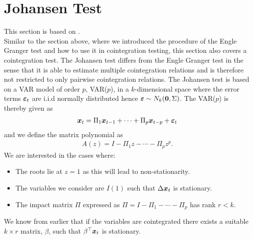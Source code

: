 \section{Johansen Test}\label{sect:johansen test}
This section is based on \cite{Johansen_test}.\\
Similar to the section above, where we introduced the procedure of the Engle Granger test and how to use it in cointegration testing, this section also covers a cointegration test. The Johansen test differs from the Engle Granger test in the sense that it is able to estimate multiple cointegration relations and is therefore not restricted to only pairwise cointegration relations. The Johansen test is based on a VAR model of order $p$, VAR($p$), in a $k$-dimensional space where the error terms $\boldsymbol{\varepsilon}_t$ are i.i.d normally distributed hence $\boldsymbol{\varepsilon}\sim N_k(\boldsymbol{0},\Sigma)$. The VAR($p$) is thereby given as
\begin{align}\label{eq:var_p_johansen}
\boldsymbol{x}_t=\Pi_1\boldsymbol{x}_{t-1}+\cdots+\Pi_p\boldsymbol{x}_{t-p}+\boldsymbol{\varepsilon}_t
\end{align}
and we define the matrix polynomial as
\begin{align*}
    A(z)=I-\Pi_1z-\cdots-\Pi_pz^p.
\end{align*}
We are interested in the cases where: 
\begin{itemize}
    \item The roots lie at $z=1$ as this will lead to non-stationarity.
    \item The variables we consider are $I(1)$ such that $\Delta \boldsymbol{x}_t$ is stationary.
    \item The impact matrix $\Pi$ expressed as $\Pi=I-\Pi_1-\cdots-\Pi_p$ has rank $r<k$.
\end{itemize}  
We know from earlier that if the variables are cointegrated there exists a suitable $k\times r$ matrix, $\beta$, such that $\beta^\top \boldsymbol{x}_t$ is stationary.\\

